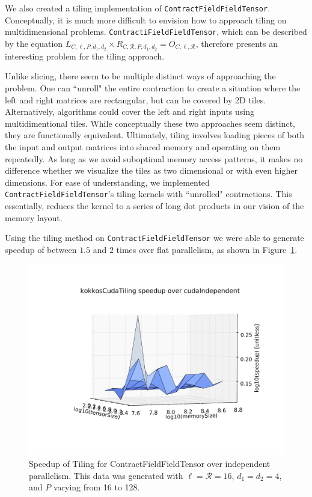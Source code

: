 We also created a tiling implementation of \texttt{ContractFieldFieldTensor}. Conceptually, it is much more difficult to envision how to approach tiling on multidimensional problems. \texttt{ContractiFieldFieldTensor}, which can be described by the equation $L_{C,\ell,P,d_1,d_2} \times R_{C, \mathcal{R}, P,d_1,d_2} = O_{C,\ell, \mathcal{R}}$, therefore presents an interesting problem for the tiling approach. 

Unlike slicing, there seem to be multiple distinct ways of approaching the
problem. One can ``unroll" the entire contraction to create a situation where
the left and right matrices are rectangular, but can be covered by 2D tiles.
Alternatively, algorithms could cover the left and right inputs using
multidimentional tiles. While conceptually these two approaches seem distinct,
they are functionally equivalent. Ultimately, tiling involves loading pieces of
both the input and output matrices into shared memory and operating on them
repeatedly. As long as we avoid suboptimal memory access patterns, it makes no
difference whether we visualize the tiles as two dimensional or with even higher
dimensions. For ease of understanding, we implemented
\texttt{ContractFieldFieldTensor}'s tiling kernels with ``unrolled"
contractions. This essentially, reduces the kernel to a series of long dot
products in our vision of the memory layout. 

Using the tiling method on \texttt{ContractFieldFieldTensor} we were able to generate speedup of between $1.5$ and $2$ times over flat parallelism, as shown in Figure~\ref{fig:CFFTSpeedup}. 

\begin{figure}[H]
    \centering
\includegraphics[scale = .2]{ContractFieldFieldTensor}
\caption{Speedup of Tiling for ContractFieldFieldTensor over independent parallelism. This data was generated with $\ell = \mathcal{R} = 16$, $d_1 = d_2 = 4$, and $P$ varying from 16 to 128.}
\label{fig:CFFTSpeedup}
\end{figure}

